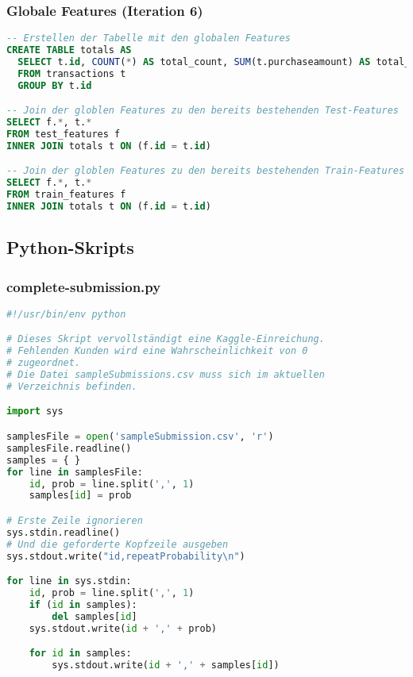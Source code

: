 \subsubsection{Globale Features (Iteration 6)}
\label{code:totals}
\begin{lstlisting}[language=SQL]
-- Erstellen der Tabelle mit den globalen Features
CREATE TABLE totals AS
  SELECT t.id, COUNT(*) AS total_count, SUM(t.purchaseamount) AS total_spent
  FROM transactions t
  GROUP BY t.id

-- Join der globlen Features zu den bereits bestehenden Test-Features
SELECT f.*, t.*
FROM test_features f
INNER JOIN totals t ON (f.id = t.id)

-- Join der globlen Features zu den bereits bestehenden Train-Features
SELECT f.*, t.*
FROM train_features f
INNER JOIN totals t ON (f.id = t.id)
\end{lstlisting}

\subsection{Python-Skripts}
\subsubsection{complete-submission.py}
\label{code:complete-submission}
\begin{lstlisting}[language=Python]
#!/usr/bin/env python

# Dieses Skript vervollständigt eine Kaggle-Einreichung.
# Fehlenden Kunden wird eine Wahrscheinlichkeit von 0 
# zugeordnet.
# Die Datei sampleSubmissions.csv muss sich im aktuellen 
# Verzeichnis befinden.

import sys

samplesFile = open('sampleSubmission.csv', 'r')
samplesFile.readline()
samples = { }
for line in samplesFile:
	id, prob = line.split(',', 1)
	samples[id] = prob

# Erste Zeile ignorieren
sys.stdin.readline()
# Und die geforderte Kopfzeile ausgeben
sys.stdout.write("id,repeatProbability\n")

for line in sys.stdin:
	id, prob = line.split(',', 1)
	if (id in samples):
		del samples[id]
	sys.stdout.write(id + ',' + prob)

	for id in samples:
		sys.stdout.write(id + ',' + samples[id])
\end{lstlisting}

